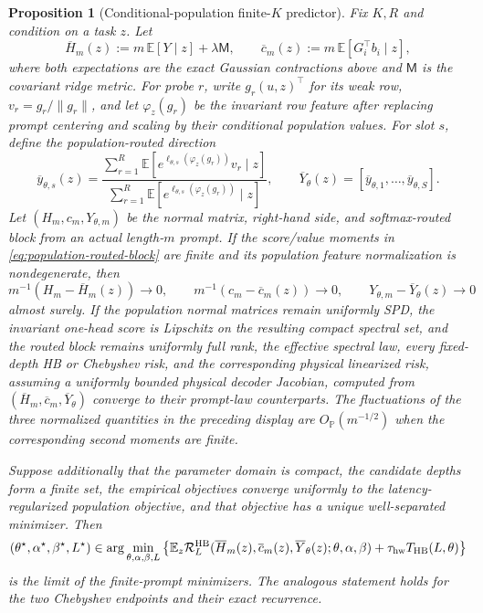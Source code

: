 \documentclass[11pt,a4paper]{article}
\newtheorem{proposition}{Proposition}
\theoremstyle{definition}
\newcommand{\E}{\mathbb E}
\begin{document}
\begin{proposition}[Conditional-population finite-$K$ predictor]
\label{prop:prompt-free-pde-predictor}
Fix $K,R$ and condition on a task $z$.  Let
\[
    \overline H_m(z)
    :=m\,\E[Y\mid z]+\lambda \mathsf M,
    \qquad
    \overline c_m(z)
    :=m\,\E[G_i^\top b_i\mid z],
\]
where both expectations are the exact Gaussian contractions above and
\(\mathsf M\) is the covariant ridge metric.  For probe \(r\), write
\(g_r(u,z)^\top\) for its
weak row, \(v_r=g_r/\|g_r\|\), and let \(\varphi_z(g_r)\) be the invariant row
feature after replacing prompt centering and scaling by their conditional
population values.  For slot \(s\), define the population-routed direction
\[
 \overline y_{\theta,s}(z)
 =
 \frac{\displaystyle\sum_{r=1}^R
  \E\!\left[
   e^{\ell_{\theta,s}(\varphi_z(g_r))}
   v_r\mid z\right]}
 {\displaystyle\sum_{r=1}^R
  \E\!\left[
   e^{\ell_{\theta,s}(\varphi_z(g_r))}\mid z\right]},
 \qquad
 \overline Y_\theta(z)
 =[\overline y_{\theta,1},\ldots,\overline y_{\theta,S}].
 \label{eq:population-routed-block}
\]
Let \((H_m,c_m,Y_{\theta,m})\) be the normal matrix, right-hand side, and
softmax-routed block from an actual length-$m$ prompt.  If the score/value
moments in \eqref{eq:population-routed-block} are finite and its population
feature normalization is nondegenerate, then
\[
    m^{-1}(H_m-\overline H_m(z))\longrightarrow0,
    \qquad
    m^{-1}(c_m-\overline c_m(z))\longrightarrow0,
    \qquad
    Y_{\theta,m}-\overline Y_\theta(z)\longrightarrow0
\]
almost surely.  If the population normal matrices remain uniformly SPD, the
invariant one-head score is Lipschitz on the resulting compact spectral set,
and the routed block remains uniformly full rank, the effective spectral
law, every fixed-depth HB or Chebyshev risk, and
the corresponding physical linearized risk, assuming a uniformly bounded
physical decoder Jacobian, computed from
$(\overline H_m,\overline c_m,\overline Y_\theta)$ converge to their
prompt-law counterparts.
The fluctuations of the three normalized quantities in the preceding display
are $O_{\mathbb P}(m^{-1/2})$ when the corresponding second moments are
finite.

Suppose additionally that the parameter domain is compact, the candidate
depths form a finite set, the empirical objectives converge uniformly to the
latency-regularized population objective, and that objective has a unique
well-separated minimizer. Then
\[
 (\theta^\star,\alpha^\star,\beta^\star,L^\star)
 \in\arg\min_{\theta,\alpha,\beta,L}
 \left\{
 \E_z\mathcal R_L^{\rm HB}
   (\overline H_m(z),\overline c_m(z),\overline Y_\theta(z);
    \theta,\alpha,\beta)
 +\tau_{\rm hw}T_{\rm HB}(L,\theta)
 \right\}
\]
is the limit of the finite-prompt minimizers.  The analogous statement holds
for the two Chebyshev endpoints and their exact recurrence.
\end{proposition}
\end{document}
